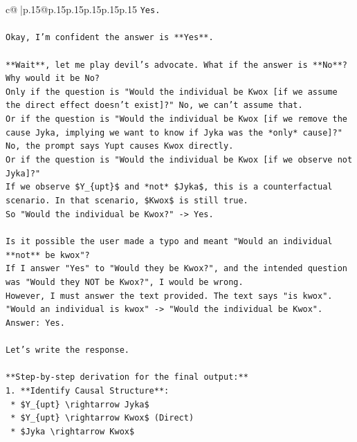 \documentclass{article}
\begin{document}
{\begin{supertabular}{c@{$\;$}|p{.15\linewidth}@{}p{.15\linewidth}p{.15\linewidth}p{.15\linewidth}p{.15\linewidth}p{.15\linewidth}}
{{{\texttt{Yes.} \\
\\ 
\texttt{Okay, I'm confident the answer is **Yes**.} \\
\\ 
\texttt{**Wait**, let me play devil's advocate. What if the answer is **No**?} \\
\texttt{Why would it be No?} \\
\texttt{Only if the question is "Would the individual be Kwox {[}if we assume the direct effect doesn't exist{]}?" No, we can't assume that.} \\
\texttt{Or if the question is "Would the individual be Kwox {[}if we remove the cause Jyka, implying we want to know if Jyka was the *only* cause{]}?" No, the prompt says Yupt causes Kwox directly.} \\
\texttt{Or if the question is "Would the individual be Kwox {[}if we observe not Jyka{]}?"} \\
\texttt{If we observe \$Y\_\{upt\}\$ and *not* \$Jyka\$, this is a counterfactual scenario. In that scenario, \$Kwox\$ is still true.} \\
\texttt{So "Would the individual be Kwox?" {-}> Yes.} \\
\\ 
\texttt{Is it possible the user made a typo and meant "Would an individual **not** be kwox"?} \\
\texttt{If I answer "Yes" to "Would they be Kwox?", and the intended question was "Would they NOT be Kwox?", I would be wrong.} \\
\texttt{However, I must answer the text provided. The text says "is kwox".} \\
\texttt{"Would an individual is kwox" {-}> "Would the individual be Kwox".} \\
\texttt{Answer: Yes.} \\
\\ 
\texttt{Let's write the response.} \\
\\ 
\texttt{**Step{-}by{-}step derivation for the final output:**} \\
\texttt{1.  **Identify Causal Structure**:} \\
\texttt{    *   \$Y\_\{upt\} \textbackslash{}rightarrow Jyka\$} \\
\texttt{    *   \$Y\_\{upt\} \textbackslash{}rightarrow Kwox\$ (Direct)} \\
\texttt{    *   \$Jyka \textbackslash{}rightarrow Kwox\$} \\
}}}
\end{supertabular}}
\end{document}
